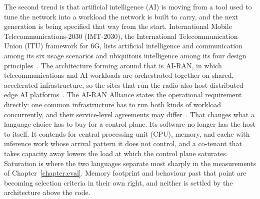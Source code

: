 \documentclass[english,twoside,openright,a4paper,censored,csm,software-track-2020]{HYthesisML}
\begin{document}
The second trend is that artificial intelligence (AI) is moving from a tool used to tune the
network into a workload the network is built to carry, and the next generation is being
specified that way from the start. International Mobile Telecommunications-2030 (IMT-2030),
the International Telecommunication Union (ITU) framework for 6G, lists artificial
intelligence and communication among its
six usage scenarios and ubiquitous intelligence among its four design
principles~\cite{itu2023imt2030}. The architecture forming around that is AI-RAN, in which
telecommunications and AI workloads are orchestrated together on shared, accelerated
infrastructure, so the sites that run the radio also host distributed edge AI
platforms~\cite{polese2026airan}. The AI-RAN Alliance states the operational requirement
directly: one common infrastructure has to run both kinds of workload concurrently, and their
service-level agreements may differ~\cite{airan2026orchestrator}. That changes what a language
choice has to buy for a control plane. Its software no longer has the host to itself. It
contends for central processing unit (CPU), memory, and cache with inference work whose
arrival pattern it does not
control, and a co-tenant that takes capacity away lowers the load at which the control plane
saturates. Saturation is where the two languages separate most sharply in the measurements of
Chapter~\ref{chapter:eval}. Memory footprint and behaviour past that point are becoming
selection criteria in their own right, and neither is settled by the architecture above the
code.
\end{document}
